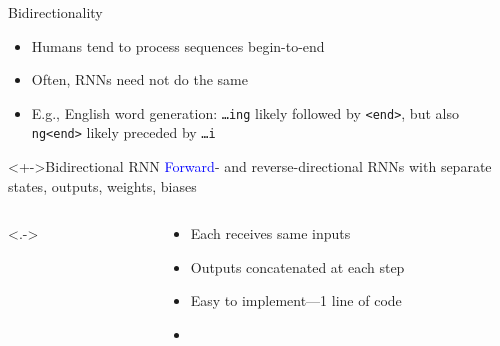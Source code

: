\begin{frame}{Bidirectionality}
    \begin{itemize}[<.->]
        \item<+-> Humans tend to process sequences begin-to-end
        \item Often, RNNs need not do the same
        \item E.g., English word generation: \texttt{\ldots{}ing} likely followed by \texttt{<end>}, but also \texttt{ng<end>} likely preceded by \texttt{\ldots{}i}
    \end{itemize}

    \begin{block}<+->{Bidirectional RNN}
        \textcolor{blue}{Forward}- and \textcolor{Green4}{reverse}-directional RNNs with separate states, outputs, weights, biases
    \end{block}

    \begin{columns}
        \begin{column}{0.6\textwidth}
            \uncover<.->{}
        \end{column}
        \begin{column}{0.4\textwidth}
            \begin{itemize}[<.->]
                \item Each receives same inputs
                \item Outputs concatenated at each step
                \item Easy to implement---1 line of code
                \item \citet{SchusterIEEESP97}
            \end{itemize}
        \end{column}
    \end{columns}
\end{frame}

